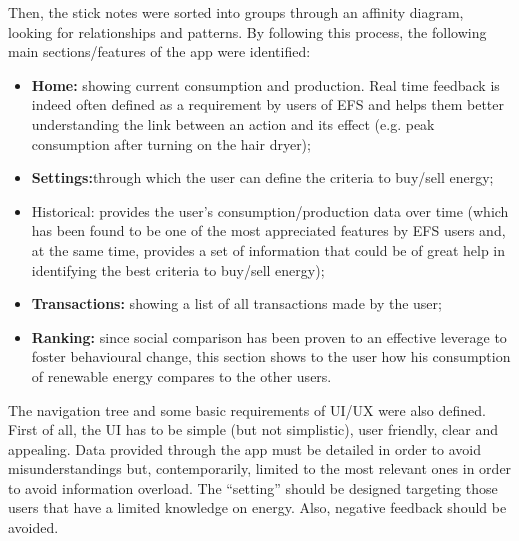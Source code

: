 Then, the stick notes were sorted into groups through an affinity diagram, looking for relationships and patterns. By following this process, the following main sections/features of the app were identified:



\begin{itemize}
    \item \textbf{Home:} showing current consumption and production. Real time feedback is indeed often defined as a requirement by users of EFS and helps them better understanding the link between an action and its effect (e.g. peak consumption after turning on the hair dryer);
    \item \textbf{Settings:}through which the user can define the criteria to buy/sell energy;
    \item {Historical:} provides the user’s consumption/production data over time (which has been found to be one of the most appreciated features by EFS users and, at the same time, provides a set of information that could be of great help in identifying the best criteria to buy/sell energy);
    \item \textbf{Transactions:} showing a list of all transactions made by the user;
    \item \textbf{Ranking:} since social comparison has been proven to an effective leverage to foster behavioural change, this section shows to the user how his consumption of renewable energy compares to the other users.
\end{itemize}


The navigation tree and some basic requirements of \ac{UI}/\ac{UX} were also defined. First of all, the \ac{UI} has to be simple (but not simplistic), user friendly, clear and appealing. Data provided through the app must be detailed in order to avoid misunderstandings but, contemporarily, limited to the most relevant ones in order to avoid information overload. The “setting” should be designed targeting  those users that have a limited knowledge on energy. Also, negative feedback should be avoided.



